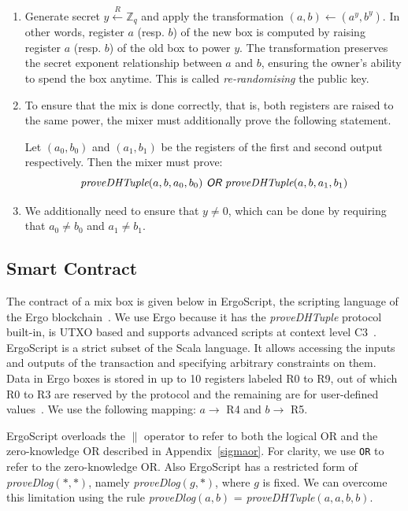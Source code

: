 \documentclass[runningheads]{llncs}
\newcommand{\rand}{\stackrel{R}{\leftarrow}}
\begin{document}
\begin{enumerate}
\item Generate secret $y \rand \mathbb{Z}_q$ and apply the transformation $(a, b) \leftarrow (a ^y, b ^y)$. In other words, register $a$ (resp. $b$) of the new box is computed by raising register $a$ (resp. $b$) of the old box to power $y$. The transformation preserves the secret exponent relationship between $a$ and $b$, ensuring the owner's ability to spend the box anytime. This is called {\em re-randomising} the public key.
\item To ensure that the mix is done correctly, that is, both registers are raised to the same power, the mixer must additionally prove the following statement.

Let $(a_0, b_0)$ and $(a_1, b_1)$ be the registers of the first and second output respectively. Then the mixer must prove:
$$\text{\em proveDHTuple$(a, b, a_0, b_0)\textsf{ OR }$proveDHTuple$(a, b, a_1, b_1)$}$$

\item We additionally need to ensure that $y \neq 0$, which can be done by requiring that $a_0 \neq b_0$ and $a_1 \neq b_1$.

\end{enumerate}

\subsection{Smart Contract}
\label{smart-contract}
The contract of a mix box is given below in ErgoScript, the scripting language of the Ergo blockchain~\cite{ergo,tutorial}. We use Ergo because it has the {\em proveDHTuple} protocol built-in, is UTXO based and supports advanced scripts at context level C3~\cite{bypassing}. ErgoScript is a strict subset of the Scala language. It allows accessing the inputs and outputs of the transaction and specifying arbitrary constraints on them.
Data in Ergo boxes is stored in up to 10 registers labeled R0 to R9, out of which R0 to R3 are reserved by the protocol and the remaining are for user-defined values~\cite{tutorial}. We use the following mapping: $a \rightarrow$ R4 and $b \rightarrow$ R5.

ErgoScript overloads the $\|$ operator to refer to both the logical OR and the zero-knowledge OR described in Appendix~\ref{sigmaor}. For clarity, we use \texttt{OR} to refer to the zero-knowledge OR. Also ErgoScript has a restricted form of {\em proveDlog$(*, *)$}, namely {\em proveDlog$(g, *)$}, where $g$ is fixed.
We can overcome this limitation using the rule {\em proveDlog$(a, b)$} = {\em proveDHTuple$(a, a, b, b)$}.
\end{document}
